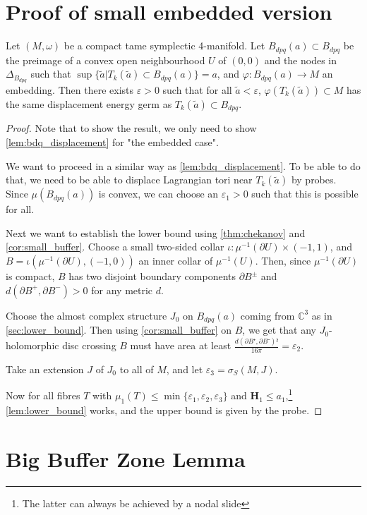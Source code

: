 \documentclass[12pt,a4paper,draft]{scrartcl}
\begin{document}
\section{Proof of small embedded version}


\begin{theorem}
  Let $(M,ω)$ be a compact tame symplectic 4-manifold. Let $B_{dpq}(a) ⊂ B_{dpq}$ be the preimage of a convex open neighbourhood $U$ of $(0,0)$ and the nodes in $Δ_{B_{dpq}}$ such that $\sup\{\tilde{a} | T_k(\tilde{a}) ⊂ B_{dpq}(a)\} = a$, and $φ \colon B_{dpq}(a) → M$ an embedding. Then there exists $ε>0$ such that for all $\tilde{a}<ε$, $φ(T_k(\tilde{a})) ⊂ M$ has the same displacement energy germ as $T_k(\tilde{a}) ⊂ B_{dpq}$.
\end{theorem}

\begin{proof}
  Note that to show the result, we only need to show \cref{lem:bdq_displacement} for "the embedded case".

  We want to proceed in a similar way as \cref{lem:bdq_displacement}. To be able to do that, we need to be able to displace Lagrangian tori near $T_k(\tilde{a})$ by probes. Since $μ(B_{dpq}(a))$ is convex, we can choose an $ε_1>0$ such that this is possible for all.

  Next we want to establish the lower bound using \cref{thm:chekanov} and \cref{cor:small_buffer}. Choose a small two-sided collar $ι \colon μ^{-1}(∂U) × (-1,1)$, and $B = ι(μ^{-1}(∂U), (-1,0))$ an inner collar of $μ^{-1}(U)$.
  Then, since $μ^{-1}(∂U)$ is compact, $B$ has two disjoint boundary components $∂B^±$ and $d(∂B^+,∂B^-) > 0$ for any metric $d$.

  Choose the almost complex structure $J_0$ on $B_{dpq}(a)$ coming from $ℂ^3$ as in \cref{sec:lower_bound}. Then using \cref{cor:small_buffer} on $B$, we get that any $J_0$-holomorphic disc crossing $B$ must have area at least $\frac{d(∂B⁺,∂B⁻)²}{16 π} = ε_2$.

  Take an extension $J$ of $J_0$ to all of $M$, and let $ε_3 = σ_S(M,J)$.

  Now for all fibres $T$ with $μ_1(T) ≤ \min\{ε_1,ε_2,ε_3\}$ and $\symbf{H}_1 ≤ a_1$,\footnote{The latter can always be achieved by a nodal slide} \cref{lem:lower_bound} works, and the upper bound is given by the probe.
\end{proof}



\section{Big Buffer Zone Lemma}
\end{document}
